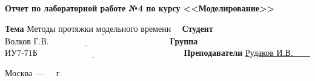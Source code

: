 \begin{titlepage}
	
	\begin{center}
		\Large\textbf{Отчет по лабораторной работе №4 по курсу <<Моделирование>>}
	\end{center}
	
	\noindent\newline\textbf{Тема} $\underline{\text{Методы протяжки модельного времени~~~}}$\newline\newline
	\noindent\textbf{Студент} $\underline{\text{Волков Г.В.~~~~~~~~~~~~~~~~~~~~~~~~~~~~~~~~~~~~~~~~~~}}$\newline\newline
	\noindent\textbf{Группа} $\underline{\text{ИУ7-71Б~~~~~~~~~~~~~~~~~~~~~~~~~~~~~~~~~~~~~~~~~~~~~~~~~~~}}$\newline\newline
	\noindent\textbf{Преподаватели} \underline{Рудаков И.В.~~~~}\newline
	
	\begin{center}
		\vfill
		Москва~---~\the\year
		~г.
	\end{center}
 \restoregeometry
\end{titlepage}
